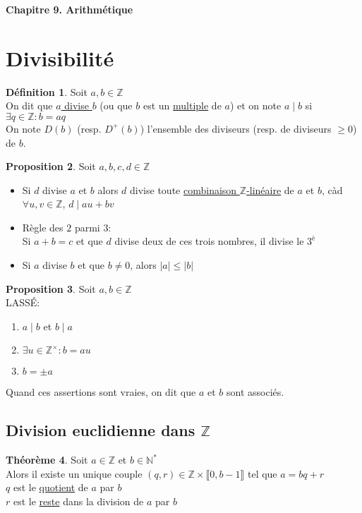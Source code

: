 \documentclass[10pt,a4paper]{article}
\theoremstyle{definition}
\newtheorem{proposition}{Proposition}[section]
\newtheorem{theorem}[proposition]{Théorème}
\newtheorem{definition}[proposition]{Définition}
\begin{document}
\renewcommand{\labelitemi}{$*$}
\renewcommand{\labelenumi}{(\roman{enumi})}
\begin{center}
{\Large \textbf{Chapitre 9. Arithmétique}}
\end{center}

\section{Divisibilité}
\begin{definition}
Soit $a, b \in \mathbb{Z}$ \\
On dit que \uline{$a$ divise $b$} (ou que $b$ est un \uline{multiple} de $a$) et on note $a \mid b$ si $\exists q \in \mathbb{Z} : b = a q$ \\
On note $D(b)$ (resp. $D^+(b)$) l'ensemble des diviseurs (resp. de diviseurs $ \geq 0$) de $b$.
\end{definition}
\begin{proposition}
Soit $a, b, c, d \in \mathbb{Z}$
\begin{itemize}
\item Si $d$ divise $a$ et $b$ alors $d$ divise toute \uline{combinaison $\mathbb{Z}$-linéaire} de $a$ et $b$, càd $\forall u, v \in \mathbb{Z}$, $d \mid a u + b v$
\item Règle des $2$ parmi $3$: \\
Si $a + b = c$ et que $d$ divise deux de ces trois nombres, il divise le $3^\text{è}$
\item Si $a$ divise $b$ et que $b \neq 0$, alors $|a| \leq |b|$
\end{itemize}
\end{proposition}
\begin{proposition}
Soit $a, b \in \mathbb{Z}$ \\
LASSÉ:
\begin{enumerate}
\item $a \mid b$ et $b \mid a$
\item $\exists u \in \mathbb{Z}^\times : b = a u$
\item $b = \pm a$
\end{enumerate}
Quand ces assertions sont vraies, on dit que $a$ et $b$ sont associés.
\end{proposition}

\subsection{Division euclidienne dans $\mathbb{Z}$}
\begin{theorem}
Soit $a \in \mathbb{Z}$ et $b \in \mathbb{N}^*$ \\
Alors il existe un unique couple $(q, r) \in \mathbb{Z} \times \llbracket 0, b - 1 \rrbracket$ tel que $a = bq + r$ \\
$q$ est le \uline{quotient} de $a$ par $b$ \\
$r$ est le \uline{reste} dans la division de $a$ par $b$
\end{theorem}
\end{document}
